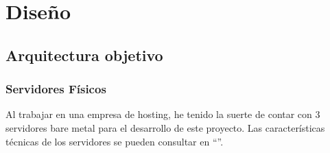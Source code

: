 \chapter {Diseño}
\section{Arquitectura objetivo}
\subsection{Servidores Físicos}
\begin{text}
	Al trabajar en una empresa de hosting, he tenido la suerte de contar con 3 servidores bare metal para el desarrollo de este proyecto. Las características técnicas de los servidores se pueden consultar en ``''.
\end{text}
